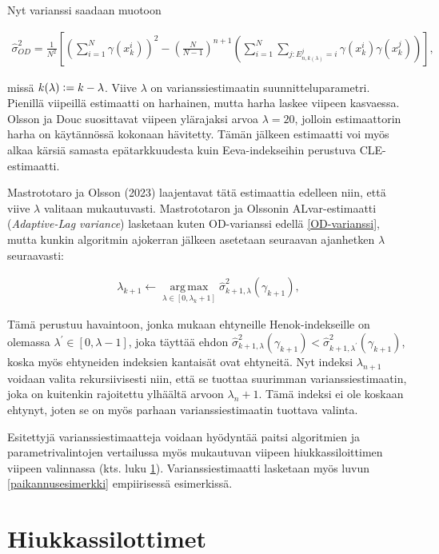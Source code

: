 \documentclass[
  12pt,
  a4paper, twoside]{book}
\begin{document}
Nyt varianssi saadaan muotoon

\begin{align}\label{OD-varianssi}
\hat{\sigma}^2_{OD} = \frac{1}{N^2} \left[ (\sum_{i=1}^N \gamma(x_k^i))^2 - (\frac{N}{N-1})^{n+1} ( \sum_{i=1}^N \sum_{j:E_{n,k(\lambda)}^j=i} \gamma(x_k^i) \gamma(x_k^j)) \right]
,\end{align}

missä \(k(\lambda) \vcentcolon= k-\lambda\). Viive \(\lambda\) on varianssiestimaatin suunnitteluparametri. Pienillä viipeillä estimaatti on harhainen, mutta harha laskee viipeen kasvaessa. Olsson ja Douc suosittavat viipeen ylärajaksi arvoa \(\lambda=20\), jolloin estimaattorin harha on käytännössä kokonaan hävitetty. Tämän jälkeen estimaatti voi myös alkaa kärsiä samasta epätarkkuudesta kuin Eeva-indekseihin perustuva CLE-estimaatti.

Mastrototaro ja Olsson (2023) \citep{Mastrototaro-2023} laajentavat tätä estimaattia edelleen niin, että viive \(\lambda\) valitaan mukautuvasti. Mastrototaron ja Olssonin ALvar-estimaatti (\emph{Adaptive-Lag variance}) lasketaan kuten OD-varianssi edellä \ref{OD-varianssi}, mutta kunkin algoritmin ajokerran jälkeen asetetaan seuraavan ajanhetken \(\lambda\) seuraavasti:

\begin{align}\label{ALvar-lambda}
\lambda_{k+1} \leftarrow \operatorname*{arg\,max}_{\lambda \in [0, \lambda_k + 1]} \hat{\sigma}^2_{k+1,\lambda} (\gamma_{k+1})
,\end{align}

Tämä perustuu havaintoon, jonka mukaan ehtyneille Henok-indekseille on olemassa \(\lambda^\prime \in [0, \lambda-1]\), joka täyttää ehdon \(\hat{\sigma}^2_{k+1,\lambda} (\gamma_{k+1}) < \hat{\sigma}^2_{k+1,\lambda^\prime} (\gamma_{k+1})\), koska myös ehtyneiden indeksien kantaisät ovat ehtyneitä. Nyt indeksi \(\lambda_{n+1}\) voidaan valita rekursiivisesti niin, että se tuottaa suurimman varianssiestimaatin, joka on kuitenkin rajoitettu ylhäältä arvoon \(\lambda_n+1\). Tämä indeksi ei ole koskaan ehtynyt, joten se on myös parhaan varianssiestimaatin tuottava valinta.

Esitettyjä varianssiestimaatteja voidaan hyödyntää paitsi algoritmien ja parametrivalintojen vertailussa myös mukautuvan viipeen hiukkassiloittimen viipeen valinnassa (kts. luku \ref{hiukkassiloittimet}). Varianssiestimaatti lasketaan myös luvun \ref{paikannusesimerkki} empiirisessä esimerkissä.

\chapter{Hiukkassilottimet} \label{hiukkassiloittimet}
\end{document}
